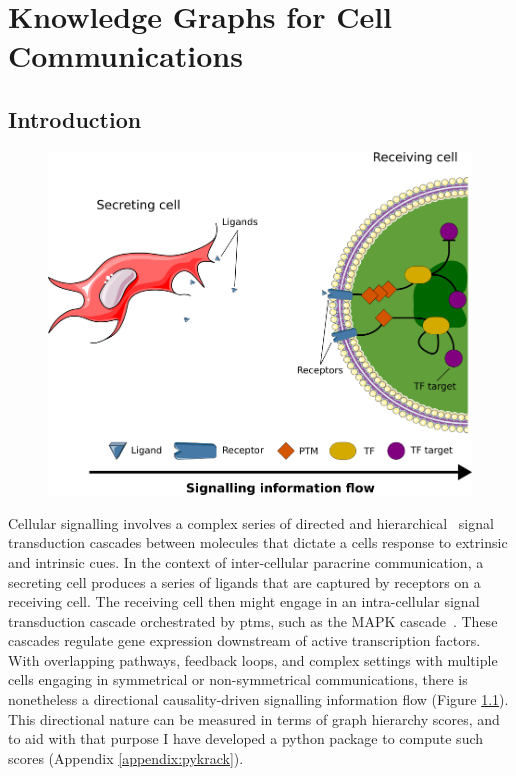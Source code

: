 \chapter{Knowledge Graphs for Cell Communications}
\label{06kg}

\newpage
\section{Introduction}

\begin{figure}
    \centering
    \includegraphics{06kg/figs/6KG_com.png}
    \caption{}
    \label{fig:6intro}
\end{figure}

Cellular signalling involves a complex series of directed and hierarchical~\cite{kumar_3_2003} signal transduction cascades between molecules that dictate a cells response to extrinsic and intrinsic cues. In the context of inter-cellular paracrine communication, a secreting cell produces a series of ligands that are captured by receptors on a receiving cell. The receiving cell then might engage in an intra-cellular signal transduction cascade orchestrated by \acrshort{ptm}s, such as the MAPK cascade~\cite{zhang_mapk_2002}. These cascades regulate gene expression downstream of active transcription factors. With overlapping pathways, feedback loops, and complex settings with multiple cells engaging in symmetrical or non-symmetrical communications, there is nonetheless a directional causality-driven signalling information flow (Figure \ref{fig:6intro}). This directional nature can be measured in terms of graph hierarchy scores, and to aid with that purpose I have developed a python package to compute such scores (Appendix \ref{appendix:pykrack}).

